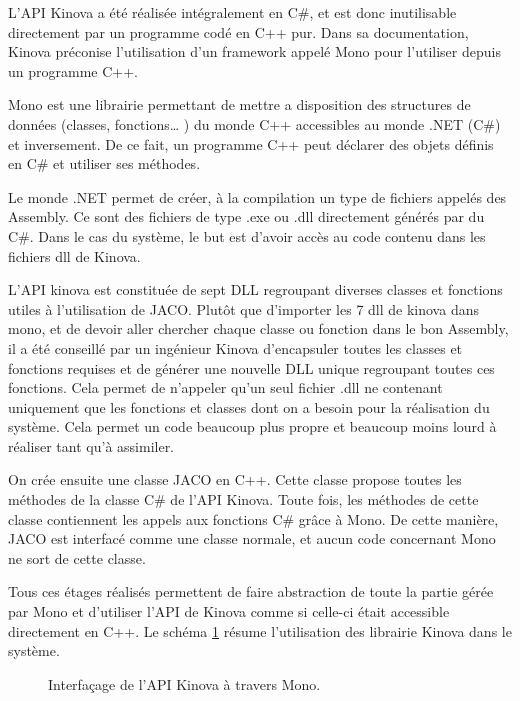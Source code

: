 \documentclass[letterpaper, twoside, 12pt, memoire, creativecommons, hyperref]{thETS}
\begin{document}
L’API Kinova a été réalisée intégralement en C\#, et est donc inutilisable directement par un programme codé en C++ pur. Dans sa documentation, Kinova préconise l'utilisation d'un framework appelé Mono pour l'utiliser depuis un programme C++.

Mono est une librairie permettant de mettre a disposition des structures de données (classes, fonctions… ) du monde C++ accessibles au monde .NET (C\#) et inversement. De ce fait, un programme C++ peut déclarer des objets définis en C\# et utiliser ses méthodes.

Le monde .NET permet de créer, à la compilation un type de fichiers appelés des Assembly. Ce sont des fichiers de type .exe ou .dll directement générés par du C\#. Dans le cas du système, le but est d’avoir accès au code contenu dans les fichiers dll de Kinova.

L’API kinova est constituée de sept DLL regroupant diverses classes et fonctions utiles à l’utilisation de JACO. Plutôt que d’importer les 7 dll de kinova dans mono, et de devoir aller chercher chaque classe ou fonction dans le bon Assembly, il a été conseillé par un ingénieur Kinova d'encapsuler toutes les
classes et fonctions requises et de générer une nouvelle DLL unique regroupant toutes ces fonctions. Cela permet de n'appeler qu'un seul fichier .dll ne contenant uniquement que les fonctions et classes dont on a besoin pour la réalisation du système. Cela permet un code beaucoup plus propre et beaucoup moins lourd à réaliser tant qu’à assimiler.

On crée ensuite une classe JACO en C++. Cette classe propose toutes les méthodes de la classe C\# de l'API Kinova. Toute fois, les méthodes de cette classe contiennent les appels aux fonctions C\# grâce à Mono. De cette manière, JACO est interfacé comme une classe normale, et aucun code concernant Mono ne sort de cette classe. 

Tous ces étages réalisés permettent de faire abstraction de toute la partie gérée par Mono et d’utiliser l’API de Kinova comme si celle-ci était accessible directement en C++. Le schéma \ref{fig:mono} résume l'utilisation des librairie Kinova dans le système.

\begin{figure}
	\centering
	\caption{Interfaçage de l'API Kinova à travers Mono.}
	\label{fig:mono}
\end{figure}
\end{document}
